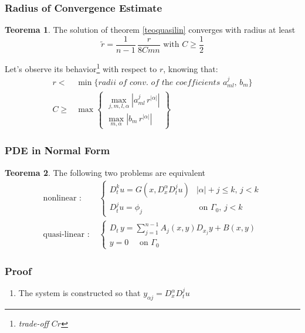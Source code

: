 \documentclass[serif,notheorems]{beamer}
\theoremstyle{definition} %
\newtheorem{theorem}{Teorema}[section] %
\theoremstyle{remark}
\begin{document}
\begin{frame}
\frametitle{Radius of Convergence Estimate}
\begin{theorem}
The solution of theorem \ref{teoquasilin} converges with radius at least
$$\widetilde{r} = \dfrac{1}{n-1}\, \dfrac{r}{8Cmn} \text{ with } C \geq \frac{1}{2}$$
\end{theorem}

Let's observe its behavior\footnote{\textit{trade-off} $Cr$} with respect to $r$, knowing that:
\begin{align*}
r <& \min \{ \textit{radii of conv. of the coefficients } a^j_{ml}, \, b_m\} \\
C \geq & \max \begin{Bmatrix}
\max\limits_{j,m,l,\alpha } \left|a^j_{ml} \, r^{|\alpha |}\right|\\
\max\limits_{m,\alpha} \left|b_m \, r^{|\alpha |}\right|
\end{Bmatrix}
\end{align*}
\end{frame}

\begin{frame}
\frametitle{PDE in Normal Form}
\begin{theorem}
The following two problems are equivalent
\begin{align*}
\text{nonlinear : }&
\begin{cases}
D_{t}^k u = G(x, D^\alpha_x D^j_t u) & |\alpha |+ j \leq k, \, j<k \\
D_t^ju = \phi_j & \text{ on } \Gamma_0, \, j<k
\end{cases} \\
\text{quasi-linear : }&
\begin{cases}
D_t \, y = \sum\limits_{j=1}^{n-1} A_j(x,y)D_{x_j}y+B(x,y) \; \\
y=0 \quad \text{ on } \Gamma_0
\end{cases}
\end{align*}
\end{theorem}
\end{frame}

\begin{frame}
\frametitle{Proof}
\begin{enumerate}
\item The system is constructed so that $y_{\alpha j}= D^\alpha_x D^j_t u$
\end{enumerate}
\end{frame}
\end{document}
